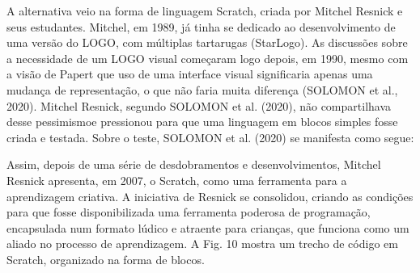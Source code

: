 \documentclass[
12pt,		%
openright,	%
twoside,  %
a4paper,			%
chapter=TITLE,		%
english,			%
french,				%
spanish,			%
brazil				%
]{USPSC-classe/USPSC}
\begin{document}
\noindent\begin{center}\mbox{\centering{}}\end{center}


A alternativa veio na forma de linguagem Scratch, criada por Mitchel Resnick e seus estudantes. Mitchel, em 1989, j\'a tinha se dedicado ao desenvolvimento de uma vers\~ao do LOGO, com m\'ultiplas tartarugas (StarLogo). As discuss\~oes sobre a necessidade de um  LOGO visual come\c{c}aram logo depois, em 1990, mesmo com a vis\~ao de Papert que uso de uma interface visual significaria apenas uma mudan\c{c}a de representa\c{c}\~ao, o que n\~ao faria muita diferen\c{c}a   (SOLOMON et al., 2020). Mitchel Resnick, segundo  SOLOMON et al. (2020), \textquotedbl n\~ao compartilhava desse pessimismo\textquotedbl  e pressionou para que uma linguagem em blocos simples fosse criada e testada. Sobre o teste,  SOLOMON et al. (2020) se manifesta como segue:


















\noindent\begin{center}\mbox{\centering{}}\end{center}


Assim, depois de uma s\'erie de desdobramentos e desenvolvimentos, Mitchel Resnick apresenta, em 2007, o Scratch, como uma ferramenta para a aprendizagem criativa. A iniciativa de Resnick se consolidou, criando as condi\c{c}\~oes para que fosse disponibilizada uma ferramenta poderosa de programa\c{c}\~ao, encapsulada num formato l\'udico e atraente para crian\c{c}as, que funciona como um aliado no processo de aprendizagem. A Fig. 10 mostra um trecho de c\'odigo em Scratch, organizado na forma de blocos.
\end{document}
